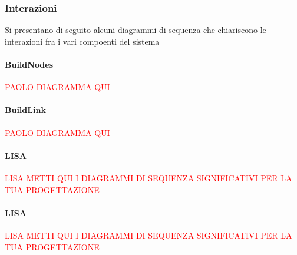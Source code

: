 \subsubsection{Interazioni}
Si presentano di seguito alcuni diagrammi di sequenza che chiariscono le interazioni fra i vari compoenti del sistema

\paragraph{BuildNodes}
\textcolor{red}{PAOLO DIAGRAMMA QUI}
\paragraph{BuildLink}
\textcolor{red}{PAOLO DIAGRAMMA QUI}
\paragraph{LISA}
\textcolor{red}{LISA METTI QUI I DIAGRAMMI DI SEQUENZA SIGNIFICATIVI PER LA TUA PROGETTAZIONE}
\paragraph{LISA}
\textcolor{red}{LISA METTI QUI I DIAGRAMMI DI SEQUENZA SIGNIFICATIVI PER LA TUA PROGETTAZIONE}












